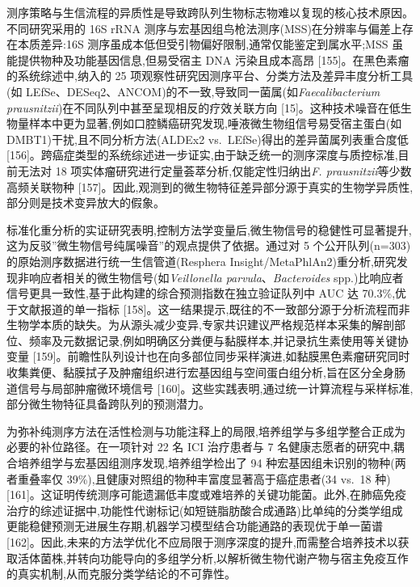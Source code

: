 \documentclass[11pt]{article}
\begin{document}
测序策略与生信流程的异质性是导致跨队列生物标志物难以复现的核心技术原因。不同研究采用的 16S rRNA 测序与宏基因组鸟枪法测序(MSS)在分辨率与偏差上存在本质差异:16S 测序虽成本低但受引物偏好限制,通常仅能鉴定到属水平;MSS 虽能提供物种及功能基因信息,但易受宿主 DNA 污染且成本高昂 {[}155{]}。在黑色素瘤的系统综述中,纳入的 25 项观察性研究因测序平台、分类方法及差异丰度分析工具(如 LEfSe、DESeq2、ANCOM)的不一致,导致同一菌属(如\emph{Faecalibacterium prausnitzii})在不同队列中甚至呈现相反的疗效关联方向 {[}15{]}。这种技术噪音在低生物量样本中更为显著,例如口腔鳞癌研究发现,唾液微生物组信号易受宿主蛋白(如 DMBT1)干扰,且不同分析方法(ALDEx2 vs.~LEfSe)得出的差异菌属列表重合度低 {[}156{]}。跨癌症类型的系统综述进一步证实,由于缺乏统一的测序深度与质控标准,目前无法对 18 项实体瘤研究进行定量荟萃分析,仅能定性归纳出\emph{F. prausnitzii}等少数高频关联物种 {[}157{]}。因此,观测到的微生物特征差异部分源于真实的生物学异质性,部分则是技术变异放大的假象。

标准化重分析的实证研究表明,控制方法学变量后,微生物信号的稳健性可显著提升,这为反驳''微生物信号纯属噪音''的观点提供了依据。通过对 5 个公开队列(n=303)的原始测序数据进行统一生信管道(Resphera Insight/MetaPhlAn2)重分析,研究发现非响应者相关的微生物信号(如\emph{Veillonella parvula}、\emph{Bacteroides} spp.)比响应者信号更具一致性,基于此构建的综合预测指数在独立验证队列中 AUC 达 70.3\%,优于文献报道的单一指标 {[}158{]}。这一结果提示,既往的不一致部分源于分析流程而非生物学本质的缺失。为从源头减少变异,专家共识建议严格规范样本采集的解剖部位、频率及元数据记录,例如明确区分粪便与黏膜样本,并记录抗生素使用等关键协变量 {[}159{]}。前瞻性队列设计也在向多部位同步采样演进,如黏膜黑色素瘤研究同时收集粪便、黏膜拭子及肿瘤组织进行宏基因组与空间蛋白组分析,旨在区分全身肠道信号与局部肿瘤微环境信号 {[}160{]}。这些实践表明,通过统一计算流程与采样标准,部分微生物特征具备跨队列的预测潜力。

为弥补纯测序方法在活性检测与功能注释上的局限,培养组学与多组学整合正成为必要的补位路径。在一项针对 22 名 ICI 治疗患者与 7 名健康志愿者的研究中,耦合培养组学与宏基因组测序发现,培养组学检出了 94 种宏基因组未识别的物种(两者重叠率仅 39\%),且健康对照组的物种丰富度显著高于癌症患者(34 vs.~18 种) {[}161{]}。这证明传统测序可能遗漏低丰度或难培养的关键功能菌。此外,在肺癌免疫治疗的综述证据中,功能性代谢标记(如短链脂肪酸合成通路)比单纯的分类学组成更能稳健预测无进展生存期,机器学习模型结合功能通路的表现优于单一菌谱 {[}162{]}。因此,未来的方法学优化不应局限于测序深度的提升,而需整合培养技术以获取活体菌株,并转向功能导向的多组学分析,以解析微生物代谢产物与宿主免疫互作的真实机制,从而克服分类学结论的不可靠性。
\end{document}
